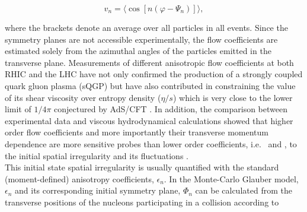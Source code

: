 
\begin{equation}
v_{n} = \langle{\cos[n(\varphi - \Psi_n)]}\rangle,
\label{Eq:vn}
\end{equation}

where the brackets denote an average over all particles in all events. Since the symmetry planes are not accessible experimentally, the flow coefficients are estimated solely from the azimuthal angles of the particles emitted in the transverse plane. Measurements of different anisotropic flow coefficients at both RHIC \cite{Adams:2003am,Abelev:2007qg,Adler:2003kt,Adare:2006ti,Alver:2007qw,Adcox:2002ms,Adamczyk:2013gw,Adler:2004cj,Afanasiev:2009wq,Adare:2011tg,Ackermann:2000tr,Adler:2001nb,Adler:2002ct,Adler:2002pu,Adams:2003zg,Adams:2004wz,Adams:2004bi} and the LHC \cite{Aamodt:2010pa, ALICE:2011ab, Abelev:2012di, Chatrchyan:2012xq, Chatrchyan:2012ta, ATLAS:2011ah, ATLAS:2012at,Abelev:2014pua,Adam:2016nfo,Adam:2016izf, Acharya:2018zuq,
Chatrchyan:2013kba, Adam:2015eta, Acharya:2018lmh,Acharya:2018ihu} have not only confirmed the production of a strongly coupled quark gluon plasma (sQGP) but have also contributed in constraining the value of its shear viscosity over entropy density ($\eta/s$) which is very close to the lower limit of $1/4\pi$ conjectured by AdS/CFT \cite{Kovtun:2004de}. In addition, the comparison between experimental data \cite{Adam:2016izf} and viscous hydrodynamical calculations \cite{Niemi:2015voa} showed that higher order flow coefficients and more importantly their transverse momentum dependence are more sensitive probes than lower order coefficients, i.e. \vtwo~and \vthree, to the initial spatial irregularity and its fluctuations \cite{Alver:2010dn}.\\ %
This initial state spatial irregularity is usually quantified with the standard (moment-defined) anisotropy coefficients, $\epsilon_{n}$. In the Monte-Carlo Glauber model, $\epsilon_{n}$ and its corresponding initial symmetry plane, $\Phi_n$ can be calculated from the transverse positions of the nucleons participating in a collision according to \cite{Teaney:2010vd, Alver:2010gr}

